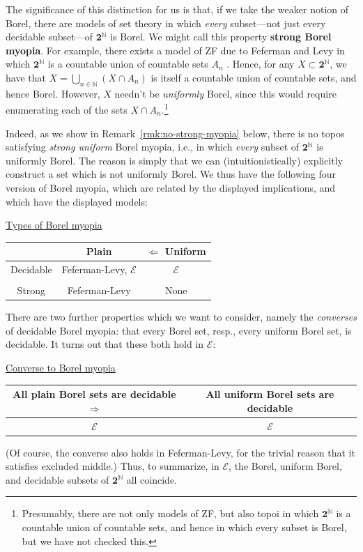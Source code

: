 \documentclass[11pt]{amsart}
\newcommand\cE{\mathcal{E}}
\newcommand\defword[1]{\textbf{#1}}
\newcommand{\N}{\mathbb{N}}
\newcommand\two{\mathbf{2}}
\theoremstyle{definition}
\theoremstyle{remark}
\theoremstyle{plain}
\begin{document}
The significance of this distinction for us is that, if we take the weaker notion of Borel, there are models of set theory in which \emph{every} subset---not just every decidable subset---of \( \two^\N \) is Borel.
We might call this property \defword{strong Borel myopia}.
For example, there exists a model of ZF due to Feferman and Levy in which \( \two^\N \) is a countable union of countable sets \( A_n \) \cite[Theorem~10.6]{jech-axiom-of-choice}.
Hence, for any \( X \subset \two^\N \), we have that \( X = \bigcup_{n \in \N} (X \cap A_n) \) is itself a countable union of countable sets, and hence Borel.
However, \( X \) needn't be \emph{uniformly} Borel, since this would require enumerating each of the sets \( X \cap A_n \).\footnote{
  Presumably, there are not only models of ZF, but also topoi in which \( \two^\N \) is a countable union of countable sets, and hence in which every subset is Borel, but we have not checked this.
}

Indeed, as we show in Remark~\ref{rmk:no-strong-myopia} below, there is no topos satisfying \emph{strong uniform} Borel myopia, i.e., in which \emph{every} subset of \( \two^\N \) is uniformly Borel.
The reason is simply that we can (intuitionistically) explicitly construct a set which is not uniformly Borel.
We thus have the following four version of Borel myopia, which are related by the displayed implications, and which have the displayed models:
\begin{center}
  \underline{Types of Borel myopia}\\[0.5em]
  \begin{tabular}{c|c|c}
    & Plain & \( \Leftarrow \) Uniform
    \\
    \hline
    Decidable & Feferman-Levy, \( \cE \) & \( \cE \) \\
    \hline
    \shortstack{%
    \( \Uparrow \) \\
    Strong
    } & Feferman-Levy & None
  \end{tabular}
\end{center}
There are two further properties which we want to consider, namely the \emph{converses} of decidable Borel myopia: that every Borel set, resp., every uniform Borel set, is decidable.
It turns out that these both hold in \( \cE \):
\begin{center}
  \underline{Converse to Borel myopia}\\[0.5em]
  \begin{tabular}{c|c}
    All plain Borel sets are decidable \( \Rightarrow \) & All uniform Borel sets are decidable
    \\
    \hline
    \( \cE \) & \( \cE \)
  \end{tabular}
\end{center}
(Of course, the converse also holds in Feferman-Levy, for the trivial reason that it satisfies excluded middle.)
Thus, to summarize, in \( \cE \), the Borel, uniform Borel, and decidable subsets of \( \two^\N \) all coincide.
\end{document}

